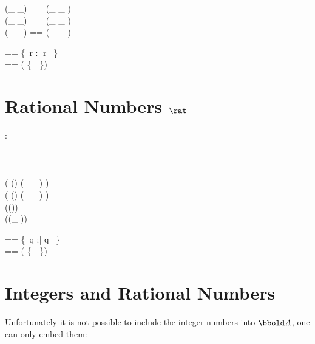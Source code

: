\documentclass[12pt]{article}
\begin{document}
\begin{zed}
  (\_ \aleq \_) == (\_ \alt \_ ) \cup \id \real \\
  (\_ \agt \_) == (\_ \alt \_ ) \inv \\
  (\_ \ageq \_) == (\_ \agt \_ ) \cup \id \real \\
\end{zed}

\begin{zed}
  \realplus == \{~r :\real | r \agt \azero~\}\\
  \realminus == \real \setminus ( \realplus \cup \{~\azero~\})
\end{zed}

\section{Rational Numbers $\rat$}
\label{sec:rational-numbers}

\begin{axdef}
  \rat : \power \real
  \where
  \azero \in \rat\\
  \aone \in \rat\\
  \atwo \in \rat\\
  \aten \in \rat\\
  \ran ( (\rat \cross \rat) \dres (\_ \aplus \_) ) \subset \rat\\
  \ran ( (\rat \cross \rat) \dres (\_ \amult \_) ) \subset \rat\\
  \ran (\rat \dres (\aneg ))  \subset \rat\\
  \ran (\rat \dres (\_ \ainv ))  \subset \rat\\
\end{axdef}

\begin{zed}
  \ratplus == \{~q :\rat | q \agt \azero~\}\\
  \ratminus == \rat \setminus ( \ratplus \cup \{~\azero~\})
\end{zed}

\section{Integers and Rational Numbers}
\label{sec:integers-and-rationals}
Unfortunately it is not possible to include the integer numbers into
$\arithmos$, one can only embed them:

\end{document}

